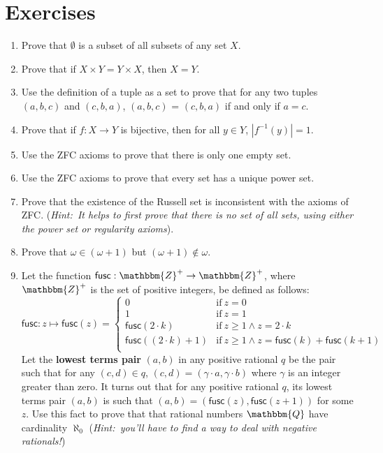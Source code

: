 \documentclass[11pt]{article}
\theoremstyle{definition}
\theoremstyle{remark}
\begin{document}
\section*{Exercises}
\begin{enumerate}
    \item Prove that $\emptyset$ is a subset of all subsets of any set $X$.

    \item Prove that if $X\times Y = Y\times X$, then $X=Y$.

    \item Use the definition of a tuple as a set to prove that for any two tuples $(a,b,c)$ and $(c,b,a)$, $(a,b,c)$ = $(c,b,a)$ if and only if $a=c$.

    \item Prove that if $f:X\rightarrow Y$ is bijective, then for all $y\in Y$, $|f^{-1}(y)|=1$. 

    \item Use the ZFC axioms to prove that there is only one empty set.

    \item Use the ZFC axioms to prove that every set has a unique power set.

    \item Prove that the existence of the Russell set is inconsistent with the axioms of ZFC. (\textit{Hint:\ It helps to first prove that there is no set of all sets, using either the power set or regularity axioms}).

    \item Prove that $\omega\in(\omega+1)$ but $(\omega + 1)\not\in\omega$. 

    \item Let the function $\textsf{fusc}:\mathbbm{Z}^{+}\rightarrow\mathbbm{Z}^{+}$, where $\mathbbm{Z}^{+}$ is the set of positive integers, be defined as follows:
    \begin{equation*}
    \textsf{fusc}:z\mapsto \textsf{fusc}(z) = \begin{cases}
        0 & \text{if} \ z=0\\
        1 & \text{if} \ z=1\\
        \textsf{fusc}(2\cdot k) & \text{if} \ z\geq 1 \wedge z=2\cdot k\\
        \textsf{fusc}((2\cdot k)+1) & \text{if} \ z\geq 1 \wedge z=\textsf{fusc}(k) + \textsf{fusc}(k+1)\\
    \end{cases}
    \end{equation*}
        Let the \textbf{lowest terms pair} $(a,b)$ in any positive rational $q$ be the pair such that for any $(c,d)\in q$, $(c,d)=(\gamma \cdot a,\gamma \cdot b)$ where $\gamma$ is an integer greater than zero. It turns out that for any positive rational $q$, its lowest terms pair $(a,b)$ is such that $(a,b)=(\textsf{fusc}(z),\textsf{fusc}(z+1))$ for some $z$. Use this fact to prove that that rational numbers $\mathbbm{Q}$ have cardinality $\aleph_{0}$ (\textit{Hint:\ you'll have to find a way to deal with negative rationals!})
\end{enumerate}
\end{document}
